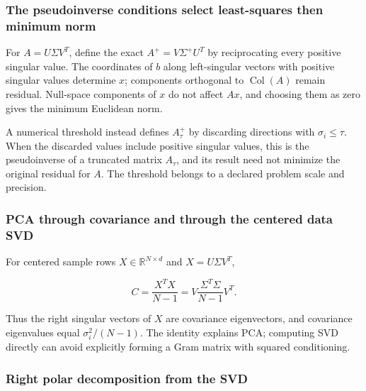 \subsubsection{The pseudoinverse conditions select least-squares then minimum norm}\label{02-foundations-ii-ch039-the-pseudoinverse-conditions-select-least-squares-then-minimum-norm}

\hypertarget{02-foundations-ii-ch039-the-pseudoinverse-conditions-select-least-squares-then-minimum-norm}{}

For \(A=U\Sigma V^T\), define the exact \(A^+=V\Sigma^+U^T\) by reciprocating every positive singular value. The coordinates of \(b\) along left-singular vectors with positive singular values determine \(x\); components orthogonal to \(\operatorname{Col}(A)\) remain residual. Null-space components of \(x\) do not affect \(Ax\), and choosing them as zero gives the minimum Euclidean norm.

A numerical threshold instead defines \(A_\tau^+\) by discarding directions with \(\sigma_i\le\tau\). When the discarded values include positive singular values, this is the pseudoinverse of a truncated matrix \(A_\tau\), and its result need not minimize the original residual for \(A\). The threshold belongs to a declared problem scale and precision.

\subsubsection{PCA through covariance and through the centered data SVD}\label{02-foundations-ii-ch039-pca-through-covariance-and-through-the-centered-data-svd}

\hypertarget{02-foundations-ii-ch039-pca-through-covariance-and-through-the-centered-data-svd}{}

For centered sample rows \(X\in\mathbb R^{N\times d}\) and \(X=U\Sigma V^T\),

\[
C=\frac{X^TX}{N-1}
=V\frac{\Sigma^T\Sigma}{N-1}V^T.
\]

Thus the right singular vectors of \(X\) are covariance eigenvectors, and covariance eigenvalues equal \(\sigma_i^2/(N-1)\). The identity explains PCA; computing SVD directly can avoid explicitly forming a Gram matrix with squared conditioning.

\subsubsection{Right polar decomposition from the SVD}\label{02-foundations-ii-ch039-right-polar-decomposition-from-the-svd}

